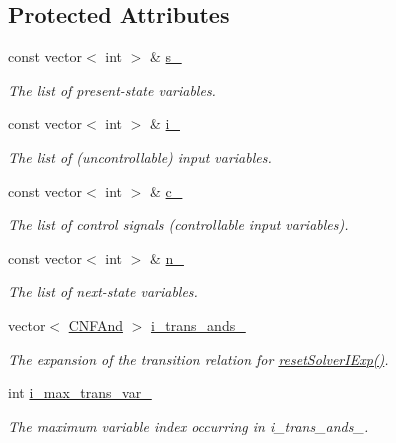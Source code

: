 \subsection*{Protected Attributes}
\begin{DoxyCompactItemize}
\item 
const vector$<$ int $>$ \& \hyperlink{classUnivExpander_a65c8d362518dae708b16a4f214511306}{s\-\_\-}
\begin{DoxyCompactList}\small\item\em The list of present-\/state variables. \end{DoxyCompactList}\item 
const vector$<$ int $>$ \& \hyperlink{classUnivExpander_ab623917d2dd9530ca51b6952862f107c}{i\-\_\-}
\begin{DoxyCompactList}\small\item\em The list of (uncontrollable) input variables. \end{DoxyCompactList}\item 
const vector$<$ int $>$ \& \hyperlink{classUnivExpander_a99d032483de0474d8489678c28bb3a64}{c\-\_\-}
\begin{DoxyCompactList}\small\item\em The list of control signals (controllable input variables). \end{DoxyCompactList}\item 
const vector$<$ int $>$ \& \hyperlink{classUnivExpander_a053df0842220ee9fa6b5ab41a2e10253}{n\-\_\-}
\begin{DoxyCompactList}\small\item\em The list of next-\/state variables. \end{DoxyCompactList}\item 
vector$<$ \hyperlink{structCNFAnd}{C\-N\-F\-And} $>$ \hyperlink{classUnivExpander_a9de6c3dba22507de35c5d5750612e423}{i\-\_\-trans\-\_\-ands\-\_\-}
\begin{DoxyCompactList}\small\item\em The expansion of the transition relation for \hyperlink{classUnivExpander_a1d6935778cefc0b441db0d7f16933a48}{reset\-Solver\-I\-Exp()}. \end{DoxyCompactList}\item 
int \hyperlink{classUnivExpander_a72fe5c141f55cc4e6097509d2309e2f7}{i\-\_\-max\-\_\-trans\-\_\-var\-\_\-}
\begin{DoxyCompactList}\small\item\em The maximum variable index occurring in i\-\_\-trans\-\_\-ands\-\_\-. \end{DoxyCompactList}\item 

\end{DoxyCompactItemize}
